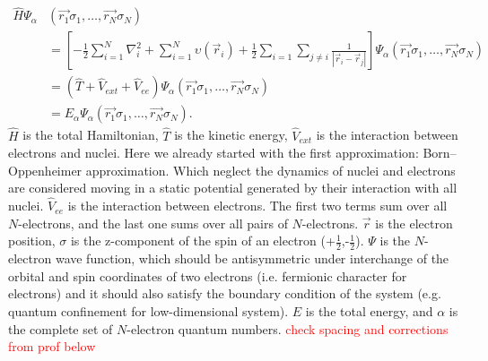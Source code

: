 \begin{equation}\begin{aligned}
\hat{H}\mathit{\Psi}_\alpha &(\vec{r_1}\sigma_1,\ldots,\vec{r_N}\sigma_N) \\
&=\left[ -\frac{1}{2}\sum^N_{i=1}\nabla_i^2+\sum^N_{i=1}\upsilon(\vec{r}_i)+\frac{1}{2}\sum_{i=1}\sum_{j\neq i}\frac{1}{|\vec{r}_i-\vec{r}_j|}\right]\mathit{\Psi}_\alpha(\vec{r_1}\sigma_1,\ldots,\vec{r_N}\sigma_N)  \\
&=\left( \hat{T} + \hat{V}_{ext} + \hat{V}_{ee}\right)\mathit{\Psi}_\alpha(\vec{r_1}\sigma_1,\ldots,\vec{r_N}\sigma_N) \\
&=E_\alpha\mathit{\Psi}_\alpha(\vec{r_1}\sigma_1,\ldots,\vec{r_N}\sigma_N) .
\end{aligned}\end{equation}
$\hat{H}$ is the total Hamiltonian, $\hat{T}$ is the kinetic energy, $\hat{V}_{ext}$ is the interaction between electrons and nuclei. Here we already started with the first approximation: Born–Oppenheimer approximation\cite{Born1927}. Which neglect the dynamics of nuclei and electrons are considered moving in a static potential generated by their interaction with all nuclei. $\hat{V}_{ee}$ is the interaction between electrons. The first two terms sum over all $N$-electrons, and the last one sums over all pairs of $N$-electrons. $\vec{r}$ is the electron position, $\sigma$ is the z-component of the spin of an electron (+$\frac{1}{2}$,-$\frac{1}{2}$). $\mathit{\Psi}$ is the $N$-electron wave function, which should be antisymmetric under interchange of the orbital and spin coordinates of two electrons (i.e. fermionic character for electrons) and it should also satisfy the boundary condition of the system (e.g. quantum confinement for low-dimensional system). $E$ is the total energy, and $\alpha$ is the complete set of $N$-electron quantum numbers. 
\textcolor{red}{check spacing and corrections from prof below}

